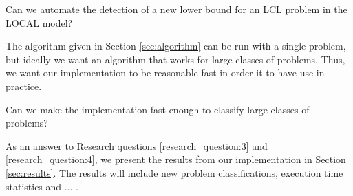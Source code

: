 \begin{researchquestion} \label{research_question:3}
Can we automate the detection of a new lower bound for an LCL problem in the LOCAL model?
\end{researchquestion}

The algorithm given in Section \ref{sec:algorithm} can be run with a single problem, but ideally we want an algorithm that works for large classes of problems.
Thus, we want our implementation to be reasonable fast in order it to have use in practice.

\begin{researchquestion} \label{research_question:4}
Can we make the implementation fast enough to classify large classes of problems?
\end{researchquestion}

As an answer to Research questions \ref{research_question:3} and \ref{research_question:4}, we present the results from our implementation in Section \ref{sec:results}.
The results will include new problem classifications, execution time statistics and ... .
